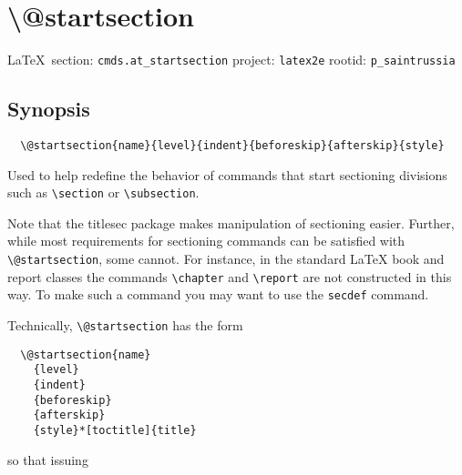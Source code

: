  
 
\section{\textbackslash @startsection}
  
\vspace{0.5cm}
 {\ifDEBUG\small\LaTeX~section: \verb|cmds.at_startsection| project: \verb|latex2e| rootid: \verb|p_saintrussia| \fi}
\vspace{0.5cm}
  
\subsection{Synopsis}

\begin{verbatim}
  \@startsection{name}{level}{indent}{beforeskip}{afterskip}{style}
\end{verbatim}

Used to help redefine the behavior of commands that start sectioning divisions such as \verb|\section| 
or \verb|\subsection|.

Note that the titlesec package makes manipulation of sectioning easier.
Further, while most requirements for sectioning commands can be satisfied with
\verb|\@startsection|, some cannot. For instance, in the standard LaTeX book and
report classes the commands \verb|\chapter| and \verb|\report| are not constructed in this
way. To make such a command you may want to use the \verb|secdef| command.

Technically, \verb|\@startsection| has the form

\begin{verbatim}
  \@startsection{name}
    {level}
    {indent}
    {beforeskip}
    {afterskip}
    {style}*[toctitle]{title}
\end{verbatim}

so that issuing

